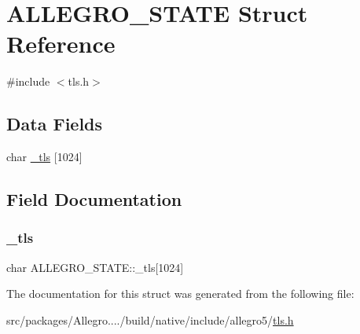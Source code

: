 \hypertarget{struct_a_l_l_e_g_r_o___s_t_a_t_e}{}\section{A\+L\+L\+E\+G\+R\+O\+\_\+\+S\+T\+A\+TE Struct Reference}
\label{struct_a_l_l_e_g_r_o___s_t_a_t_e}


{\ttfamily \#include $<$tls.\+h$>$}

\subsection*{Data Fields}
\begin{DoxyCompactItemize}
\item 
char \hyperlink{struct_a_l_l_e_g_r_o___s_t_a_t_e_ae2da2f099036acd0cdd0e61d2c81f89e}{\+\_\+tls} \mbox{[}1024\mbox{]}
\end{DoxyCompactItemize}


\subsection{Field Documentation}
\mbox{\label{struct_a_l_l_e_g_r_o___s_t_a_t_e_ae2da2f099036acd0cdd0e61d2c81f89e}} 
\subsubsection{\texorpdfstring{\+\_\+tls}{\_tls}}
{\footnotesize\ttfamily char A\+L\+L\+E\+G\+R\+O\+\_\+\+S\+T\+A\+T\+E\+::\+\_\+tls\mbox{[}1024\mbox{]}}



The documentation for this struct was generated from the following file\+:\begin{DoxyCompactItemize}
\item 
src/packages/\+Allegro..../build/native/include/allegro5/\hyperlink{tls_8h}{tls.\+h}\end{DoxyCompactItemize}
